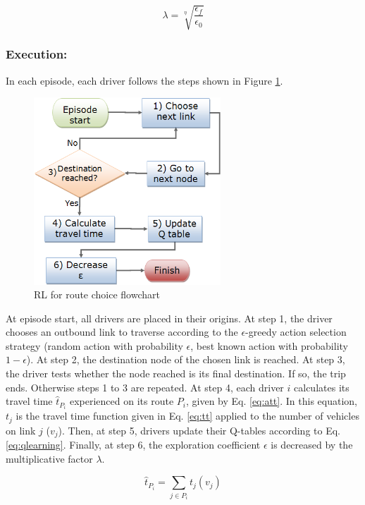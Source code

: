 \documentclass{RITA}
\newcommand{\route}[1]{\ensuremath{P_#1}}	%
\newcommand{\travTime}{\ensuremath{t_j}} 	%
\newcommand{\veh}{\ensuremath{v}}		%
\newcommand{\att}[1]{\ensuremath{\hat{t}_{#1}}}		%
\newcommand{\numepis}{\ensuremath{\eta}}	%
\begin{document}
\begin{equation}
\label{eq:lambda}
\lambda = \sqrt[\numepis]{\frac{\epsilon_f}{\epsilon_0}}
\end{equation}

\subsubsection{Execution:}

In each episode, each driver follows the steps shown in Figure \ref{fig:flowchart}.

\begin{figure}[ht]
    \centerline{\includegraphics[width=7cm]{img/flowchart3.png}}
    \caption{RL for route choice flowchart}
    \label{fig:flowchart}
\end{figure}

At episode start, all drivers are placed in their origins. At step 1, the driver chooses an outbound link to traverse according to the $\epsilon$-greedy action selection strategy (random action with probability $\epsilon$, best known action with probability $1 - \epsilon$). At step 2, the destination node of the chosen link is reached. At step 3, the driver tests whether the node reached is its final destination. If so, the trip ends. Otherwise steps 1 to 3 are repeated. At step 4, each driver $i$ calculates its travel time $\att{\route{i}}$ experienced on its route $\route{i}$, given by Eq. \eqref{eq:att}. In this equation, $\travTime$ is the travel time function given in Eq. \eqref{eq:tt} applied to the number of vehicles on link $j$ ($\veh_j$). Then, at step 5, drivers update their Q-tables according to Eq. \eqref{eq:qlearning}. Finally, at step 6, the exploration coefficient $\epsilon$ is decreased by the multiplicative factor $\lambda$.

\begin{equation}
\label{eq:att}
\att{\route{i}} = \sum_{j \in \route{i}} \travTime(\veh_j)
\end{equation}
\end{document}
